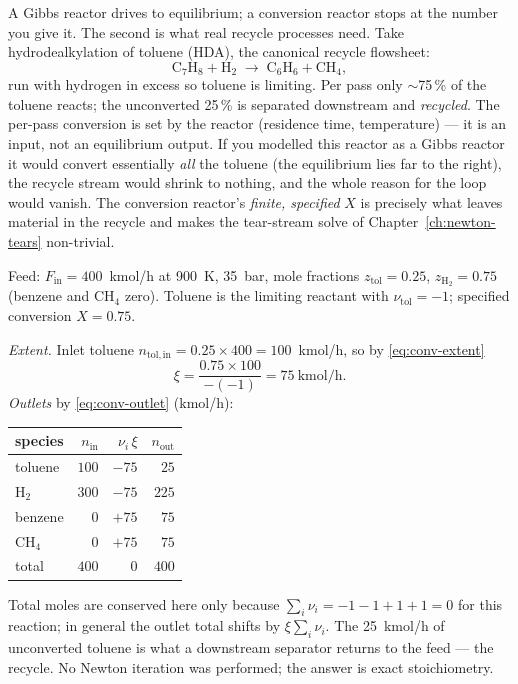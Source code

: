 \documentclass[11pt,a4paper]{article}
\begin{document}
A Gibbs reactor drives to equilibrium; a conversion reactor stops at
the number you give it. The second is what real recycle processes need.
Take hydrodealkylation of toluene (HDA), the canonical recycle
flowsheet:
\begin{equation*}
   \mathrm{C_7H_8} + \mathrm{H_2} \;\longrightarrow\;
   \mathrm{C_6H_6} + \mathrm{CH_4},
\end{equation*}
run with hydrogen in excess so toluene is limiting. Per pass only
$\sim$75\,\% of the toluene reacts; the unconverted 25\,\% is separated
downstream and \emph{recycled}. The per-pass conversion is set by the
reactor (residence time, temperature) --- it is an input, not an
equilibrium output. If you modelled this reactor as a Gibbs reactor it
would convert essentially \emph{all} the toluene (the equilibrium lies
far to the right), the recycle stream would shrink to nothing, and the
whole reason for the loop would vanish. The conversion reactor's
\emph{finite, specified} $X$ is precisely what leaves material in the
recycle and makes the tear-stream solve of
Chapter~\ref{ch:newton-tears} non-trivial.

\begin{example}
Feed: $F_{\mathrm{in}} = 400$~kmol/h at 900~K, 35~bar, mole fractions
$z_{\mathrm{tol}} = 0.25$, $z_{\mathrm{H_2}} = 0.75$ (benzene and
$\mathrm{CH_4}$ zero). Toluene is the limiting reactant with
$\nu_{\mathrm{tol}} = -1$; specified conversion $X = 0.75$.

\emph{Extent.} Inlet toluene
$n_{\mathrm{tol,in}} = 0.25 \times 400 = 100$~kmol/h, so by
\eqref{eq:conv-extent}
\[
   \xi = \frac{0.75 \times 100}{-(-1)} = 75~\text{kmol/h}.
\]
\emph{Outlets} by \eqref{eq:conv-outlet} (kmol/h):
\begin{center}
\begin{tabular}{lrrr}
   \toprule
   species & $n_{\mathrm{in}}$ & $\nu_i\,\xi$ & $n_{\mathrm{out}}$ \\
   \midrule
   toluene & $100$ & $-75$ & $25$ \\
   $\mathrm{H_2}$ & $300$ & $-75$ & $225$ \\
   benzene & $0$   & $+75$ & $75$ \\
   $\mathrm{CH_4}$ & $0$  & $+75$ & $75$ \\
   \midrule
   total & $400$ & $0$ & $400$ \\
   \bottomrule
\end{tabular}
\end{center}
Total moles are conserved here only because
$\sum_i \nu_i = -1-1+1+1 = 0$ for this reaction; in general the outlet
total shifts by $\xi\sum_i \nu_i$. The 25~kmol/h of unconverted toluene
is what a downstream separator returns to the feed --- the recycle. No
Newton iteration was performed; the answer is exact stoichiometry.
\end{example}
\end{document}

